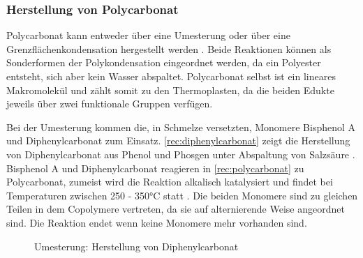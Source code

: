 \subsubsection{Herstellung von Polycarbonat}

Polycarbonat kann entweder über eine Umesterung oder über eine
Grenzflächenkondensation hergestellt werden \cite{cuzpe}. Beide Reaktionen
können als Sonderformen der Polykondensation eingeordnet werden, da ein
Polyester entsteht, sich aber kein Wasser abspaltet. Polycarbonat selbst ist ein
lineares Makromolekül und zählt somit zu den Thermoplasten, da die beiden Edukte
jeweils über zwei funktionale Gruppen verfügen.

Bei der Umesterung kommen die, in Schmelze versetzten, Monomere Bisphenol A und
Diphenylcarbonat zum Einsatz. \autoref{rec:diphenylcarbonat} zeigt die
Herstellung von Diphenylcarbonat aus Phenol und Phosgen unter Abspaltung von
Salzsäure \cite{cuzpe}. Bisphenol A und Diphenylcarbonat reagieren in
\autoref{rec:polycarbonat} zu Polycarbonat, zumeist wird die Reaktion alkalisch
katalysiert und findet bei Temperaturen zwischen 250 - 350°C statt \cite{pop}.
Die beiden Monomere sind zu gleichen Teilen in dem Copolymere vertreten, da sie
auf alternierende Weise angeordnet sind. Die Reaktion endet wenn keine Monomere
mehr vorhanden sind.

\begin{figure}[h]
    \begin{center}
        \footnotesize
        \setatomsep{1.7em}

        \chemsign{+}
        \chemrel{->}
        \chemsign{+}

        \caption{Umesterung: Herstellung von Diphenylcarbonat}
        \label{rec:diphenylcarbonat}
    \end{center}
\end{figure}


